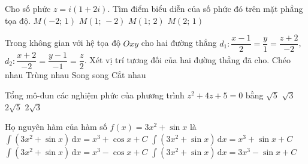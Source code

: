 \begin{ex}%
Cho số phức $z=i\left( 1+2i \right)$. Tìm điểm biểu diễn của số phức đó trên mặt phẳng tọa độ.
\choice
{\True $M\left( -2;\,1 \right)$}
{ $M\left( 1;\,-2 \right)$}
{ $M\left( 1;\,2 \right)$}
{ $M\left( 2;\,1 \right)$}
\end{ex}

\begin{ex}%
Trong không gian với hệ tọa độ $Oxy$ cho hai đường thẳng $d_1\colon\dfrac{x-1}{2}=\dfrac{y}{1}=\dfrac{z+2}{-2}$,  $d_2\colon\dfrac{x+2}{-2}=\dfrac{y-1}{-1}=\dfrac{z}{2}$. Xét vị trí tương đối của hai đường thẳng đã cho.
\choice
{Chéo nhau}
{Trùng nhau}
{\True  Song song}
{Cắt nhau}
\end{ex}

\begin{ex}%
Tổng mô-đun các nghiệm phức của phương trình $z^2+4z+5=0$ bằng
\choice
{$\sqrt{5}$}
{$\sqrt{3}$}
{\True $2\sqrt{5}$}
{$2\sqrt{3}$}
\end{ex}

\begin{ex}%
Họ nguyên hàm của hàm số $f(x)=3x^2+\sin x$ là
\choice
{$\displaystyle\int \left(3x^2+\sin x\right) \mathrm{\,d}x=x^3+\cos x+C$}
{$\displaystyle\int \left(3x^2+\sin x\right) \mathrm{\,d}x=x^3+\sin x+ C$}
{\True $\displaystyle\int \left(3x^2+\sin x\right) \mathrm{\,d}x=x^3 -\cos x+C$}
{$\displaystyle\int \left(3x^2+\sin x\right) \mathrm{\,d}x=3x^3-\sin x+C$}
\end{ex}
